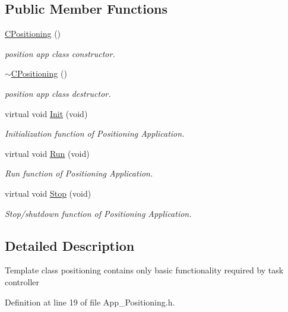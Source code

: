 \subsection*{Public Member Functions}
\begin{DoxyCompactItemize}
\item 
\mbox{\hyperlink{class_c_positioning_a2ef1dd3d4755b30ac7b800876de70869}{C\+Positioning}} ()
\begin{DoxyCompactList}\small\item\em position app class constructor. \end{DoxyCompactList}\item 
\mbox{\hyperlink{class_c_positioning_a2d1846176104d85f119010a471f6483d}{$\sim$\+C\+Positioning}} ()
\begin{DoxyCompactList}\small\item\em position app class destructor. \end{DoxyCompactList}\item 
virtual void \mbox{\hyperlink{class_c_positioning_abdceba66e701554a178acf61c61b0df6}{Init}} (void)
\begin{DoxyCompactList}\small\item\em Initialization function of Positioning Application. \end{DoxyCompactList}\item 
virtual void \mbox{\hyperlink{class_c_positioning_ad0e439dcc95c450548c2806077aeff57}{Run}} (void)
\begin{DoxyCompactList}\small\item\em Run function of Positioning Application. \end{DoxyCompactList}\item 
virtual void \mbox{\hyperlink{class_c_positioning_a2706c9bb6bb52201c279386fd2c9dd89}{Stop}} (void)
\begin{DoxyCompactList}\small\item\em Stop/shutdown function of Positioning Application. \end{DoxyCompactList}\end{DoxyCompactItemize}


\subsection{Detailed Description}
Template class positioning contains only basic functionality required by task controller 

Definition at line 19 of file App\+\_\+\+Positioning.\+h.



